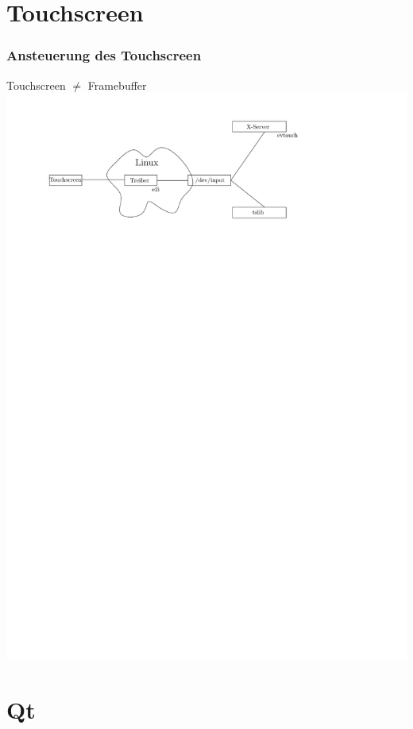 \documentclass{beamer}
\begin{document}
  \section{Touchscreen}
	
	\begin{frame}
		\frametitle{Ansteuerung des Touchscreen}
    \begin{block}{Touchscreen $\neq$ Framebuffer}
    \includegraphics[width=\textwidth]{img/touchscreen/uebersicht.pdf}
    \end{block}
	\end{frame}	
	
	\section{Qt}
	
\end{document}
